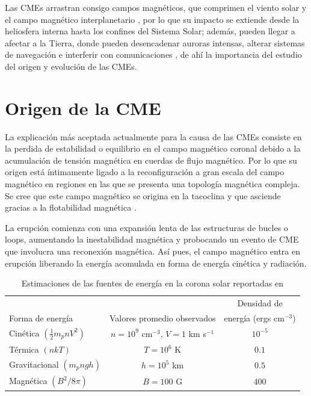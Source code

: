 Las CMEs arrastran consigo campos magnéticos, que comprimen el viento solar y el campo magnético interplanetario \parencite[e.g.,][]{vrsnak-2012, subramanian-2016, gopalswamy-2000, lugaz-2017}, por lo que su impacto se extiende desde la heliosfera interna hasta los confines del Sistema Solar; además, pueden llegar a afectar a la Tierra, donde pueden desencadenar auroras intensas, alterar sistemas de navegación e interferir con comunicaciones \parencite[e.g.,][]{2014swcm.book.....H, nhess-2018-92}, de ahí la importancia del estudio del origen y evolución de las CMEs.

\section{Origen de la CME}

La explicación más aceptada actualmente para la causa de las CMEs consiste en la perdida de estabilidad o equilibrio en el campo magnético coronal \parencite[e.g.,][]{forbes-2000, low-1996} debido a la acumulación de tensión magnética en cuerdas de flujo magnético. Por lo que su origen está íntimamente ligado a la reconfiguración a gran escala del campo magnético en regiones en las que se presenta una topología magnética compleja. Se cree que este campo magnético se origina en la tacoclina \parencite[e.g.,][]{glatzmaier-1985} y que asciende gracias a la flotabilidad magnética \parencite[e.g.,][]{low-1996, browning-1986}.

La erupción comienza con una expansión lenta de las estructuras de bucles o loops, aumentando la inestabilidad magnética y probocando un evento de CME que involucra una reconexión magnética. Así pues, el campo magnético entra en erupción liberando la energía acomulada en forma de energía cinética y radiación.

\begin{table}[htbp]
\centering
\caption{Estimaciones de las fuentes de energía en la corona solar reportadas en  \textcite[e.g.,][]{forbes-2000}}
\label{tab:fuentes-energia-corona}
\begin{tabular}{lcc}
\toprule
 &  & Densidad de \\
Forma de energía & Valores promedio observados & energía (ergs cm$^{-3}$) \\
\midrule
Cinética $\left( \frac{1}{2} m_p n V^2 \right)$ & $n = 10^9$ cm$^{-3}$, $V = 1$ km s$^{-1}$ & $10^{-5}$ \\
Térmica $\left( n k T \right)$ & $T = 10^6$ K & $0.1$ \\
Gravitacional $\left( m_p n g h \right)$ & $h = 10^5$ km & $0.5$ \\
Magnética $\left( B^2 / 8\pi \right)$ & $B = 100$ G & $400$ \\
\bottomrule
\end{tabular}
\end{table}


